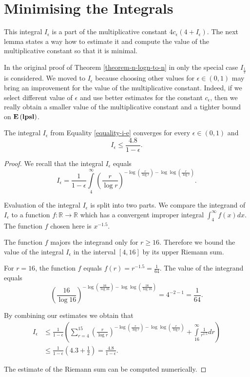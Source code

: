 \section{Minimising the Integrals}
This integral $I_\epsilon$ is a part of the multiplicative constant $4c_\epsilon(4 + I_\epsilon)$. The next lemma states a way how to estimate it and compute the value of the multiplicative constant so that it is minimal.

In the original proof of Theorem \ref{theorem-n-logn-to-n} in \cite{DBLP:journals/jacm/AlonDMPT99} only the special case $I_{\frac{1}{2}}$ is considered. We moved to $I_\epsilon$ because choosing other values for $\epsilon \in (0, 1)$ may bring an improvement for the value of the multiplicative constant. Indeed, if we select different value of $\epsilon$ and use better estimates for the constant $c_\epsilon$, then we really obtain a smaller value of the multiplicative constant and a tighter bound on $\mathbf{E}\left(\mathbf{lpsl}\right)$.

\label{section-integral-estimate}
\begin{lemma}
\label{lemma-convergent-I-e}
The integral $I_\epsilon$ from Equality \ref{equality-i-e} converges for every $\epsilon \in (0, 1)$ and
\[
I_\epsilon \leq \frac{4.8}{1 - \epsilon} \text{.}
\]
\end{lemma}
\begin{proof}
We recall that the integral $I_\epsilon$ equals
\[
I_{\epsilon} = \frac{1}{1 - \epsilon} \displaystyle\int\limits_4^\infty \left(\frac{r}{\log r}\right)^{-\log \left(\frac{r}{\log r}\right) - \log \log \left(\frac{r}{\log r}\right)} \text{.}
\]

Evaluation of the integral $I_\epsilon$ is split into two parts. We compare the integrand of $I_\epsilon$ to a function $f: \mathbb{R} \rightarrow \mathbb{R}$ which has a convergent improper integral $\int_{4}^{\infty} f(x) dx$. The function $f$ chosen here is $x ^ {-1.5}$. 

The function $f$ majors the integrand only for $r \geq 16$. Therefore we bound the value of the integral $I_\epsilon$ in the interval $[4, 16]$ by its upper Riemann sum.

For $r = 16$, the function $f$ equals $f(r) = r ^ {-1.5} = \frac{1}{64}$.
The value of the integrand equals
\[
	\left(\frac{16}{\log 16}\right)^{-\log \left(\frac{16}{\log 16}\right) - \log \log \left(\frac{16}{\log 16}\right)} = 4^{-2 - 1} = \frac{1}{64} \text{.}
\]

By combining our estimates we obtain that
\[
\begin{split}
I_{\epsilon} 
	& \leq \frac{1}{1 - \epsilon} \left( \displaystyle \sum_{r = 4}^{15} \left(\frac{r}{\log r}\right)^{-\log \left(\frac{r}{\log r}\right) - \log \log \left(\frac{r}{\log r}\right)} + \int\limits_{16}^\infty \frac{1}{r^{1.5}} dr \right) \\
	& \leq \frac{1}{1 - \epsilon} \left(4.3 + \frac{1}{2}\right) = \frac{4.8}{1-\epsilon} \text{.}
\end{split}
\]

The estimate of the Riemann sum can be computed numerically.
\end{proof}

